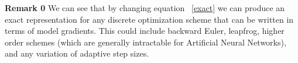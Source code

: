 

\textbf{Remark 0} We can see that by changing equation ~\ref{exact} we can produce an exact representation for any discrete optimization scheme that can be written in terms of model gradients. This could include backward Euler, leapfrog, higher order schemes (which are generally intractable for Artificial Neural Networks), and any variation of adaptive step sizes. 

